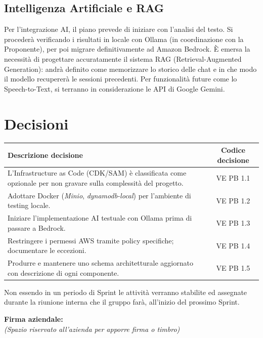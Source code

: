 \documentclass[a4paper,12pt]{article}
\newcommand{\ignoreglossary}{}
\begin{document}
\subsection{Intelligenza Artificiale e RAG}
Per l'integrazione AI, il piano prevede di iniziare con l'analisi del testo. Si procederà verificando i risultati in locale con Ollama (in coordinazione con la Proponente), per poi migrare definitivamente ad Amazon Bedrock.
È emersa la necessità di progettare accuratamente il sistema RAG (Retrieval-Augmented Generation): andrà definito come memorizzare lo storico delle chat e in che modo il modello recupererà le sessioni precedenti. Per funzionalità future come lo Speech-to-Text, si terranno in considerazione le API di Google Gemini.

\section{Decisioni}
\begin{center}
\small
\renewcommand{\arraystretch}{1.2} 
\begin{tabular}{|p{}|c|}
\hline
\rowcolor{gray!60} 
\textbf{Descrizione decisione} & \textbf{Codice decisione} \\
\hline
\rowcolor{white}
L'Infrastructure as Code (CDK/SAM) è classificata come opzionale per non gravare sulla complessità del progetto. & VE \ignoreglossary{PB} 1.1 \\
\hline
\rowcolor{gray!20}
Adottare Docker (\textit{Minio}, \textit{dynamodb-local}) per l'ambiente di testing locale. &  VE \ignoreglossary{PB} 1.2 \\
\hline
\rowcolor{white}
Iniziare l'implementazione AI testuale con Ollama prima di passare a Bedrock. &  VE \ignoreglossary{PB} 1.3 \\
\hline
\rowcolor{gray!20}
Restringere i permessi AWS tramite policy specifiche; documentare le eccezioni. & VE \ignoreglossary{PB} 1.4 \\
\hline
\rowcolor{white}
Produrre e mantenere uno schema architetturale aggiornato con descrizione di ogni componente. &  VE \ignoreglossary{PB} 1.5 \\
\hline
\end{tabular}
\end{center}

Non essendo  in un periodo di Sprint le attività verranno stabilite ed assegnate durante la riunione interna che il gruppo farà, all'inizio del prossimo Sprint.

\vspace*{\fill}
\noindent
\begin{minipage}{0.60\textwidth}
    {\small
    \textbf{Firma aziendale:}\\[0.3cm]
    \textit{(Spazio riservato all’azienda per apporre firma o timbro)}\\[0.8cm]
    \fbox{\rule{0pt}{2.5cm}\rule{5cm}{0pt}} 
    }
\end{minipage}
\end{document}
